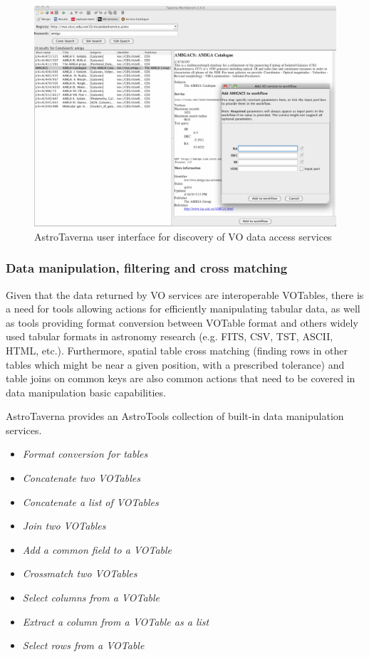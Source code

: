 \documentclass{aa}
\begin{document}
\begin{figure}[tb]
\centering 
\includegraphics[width=0.99\columnwidth]{VODiscovery}
\caption{AstroTaverna user interface for discovery of VO data access services}
\label{fig:VODiscovery}
\end{figure}

\subsubsection{Data manipulation, filtering and cross matching}
\label{DataManipulation}

Given that the data returned by VO services are interoperable VOTables, there is a need for tools allowing actions for efficiently manipulating tabular data, as well as tools providing format conversion between VOTable format and others widely used tabular formats in astronomy research (e.g. FITS, CSV, TST, ASCII, HTML, etc.). Furthermore, spatial table cross matching (finding rows in other tables which might be near a given position, with a prescribed tolerance) and table joins on common keys are also common actions that need to be covered in data manipulation basic capabilities.

AstroTaverna provides an AstroTools collection of built-in data manipulation services.
\begin{itemize}
\item \textit{Format conversion for tables}
\item \textit{Concatenate two VOTables}
\item \textit{Concatenate a list of VOTables}
\item \textit{Join two VOTables}
\item \textit{Add a common field to a VOTable}
\item \textit{Crossmatch two VOTables}
\item \textit{Select columns from a VOTable}
\item \textit{Extract a column from a VOTable as a list}
\item \textit{Select rows from a VOTable}
\end{itemize}
\end{document}
